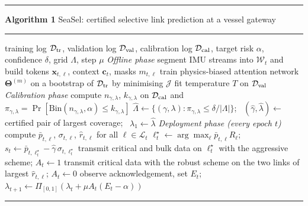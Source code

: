 \documentclass[11pt,border=6pt,varwidth=16.5cm]{standalone}
\begin{document}
\begin{minipage}{16cm}
\hrule\smallskip\noindent\textbf{Algorithm 1} SeaSel: certified selective link prediction at a vessel gateway\smallskip\hrule
\begin{algorithmic}[1]
\Require training log $\mathcal D_{\rm tr}$, validation log $\mathcal D_{\rm val}$, calibration log $\mathcal D_{\rm cal}$, target risk $\alpha$, confidence $\delta$, grid $\Lambda$, step $\mu$
\Statex \textit{Offline phase}
\State segment IMU streams into $\mathcal W_t$ and build tokens $\bm x_{t,\ell}$, context $\bm c_t$, masks $m_{t,\ell}$ 
  \State train physics-biased attention network $\bm\Theta^{(m)}$ on a bootstrap of $\mathcal D_{\rm tr}$ by minimising $\mathcal J$ 
\EndFor
\State fit temperature $T$ on $\mathcal D_{\rm val}$ 
\Statex \textit{Calibration phase}
\For{$(\gamma,\lambda)\in\Lambda$}
  \State compute $n_{\gamma,\lambda}$, $k_{\gamma,\lambda}$ on $\mathcal D_{\rm cal}$ and $\pi_{\gamma,\lambda}=\Pr[\mathrm{Bin}(n_{\gamma,\lambda},\alpha)\le k_{\gamma,\lambda}]$ 
\EndFor
\State $\hat\Lambda\gets\{(\gamma,\lambda):\pi_{\gamma,\lambda}\le\delta/|\Lambda|\}$; \ $(\hat\gamma,\hat\lambda)\gets$ certified pair of largest coverage; \ $\lambda_1\gets\hat\lambda$ 
\Statex \textit{Deployment phase (every epoch $t$)}
\State compute $\bar p_{t,\ell}$, $\sigma_{t,\ell}$, $\hat r_{t,\ell}$ for all $\ell\in\mathcal L_t$ 
\State $\ell^\star_t\gets\arg\max_\ell \bar p_{t,\ell}R_\ell$; \ $s_t\gets\bar p_{t,\ell^\star_t}-\hat\gamma\,\sigma_{t,\ell^\star_t}$ 
  \State transmit critical and bulk data on $\ell^\star_t$ with the aggressive scheme; $A_t\gets1$
\Else
  \State transmit critical data with the robust scheme on the two links of largest $\hat r_{t,\ell}$; $A_t\gets0$
\EndIf
\State observe acknowledgement, set $E_t$; \ $\lambda_{t+1}\gets\Pi_{[0,1]}(\lambda_t+\mu A_t(E_t-\alpha))$ 
\end{algorithmic}
\hrule
\end{minipage}
\end{document}
